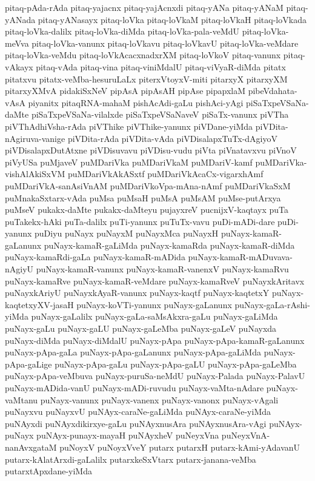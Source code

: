{pitaq-pAda-rAda
pitaq-yajacnx
pitaq-yajAcnxdi
pitaq-yANa
pitaq-yANaM
pitaq-yANada
pitaq-yANasayx
pitaq-loVka
pitaq-loVkaM
pitaq-loVkaH
pitaq-loVkada
pitaq-loVka-dalilx
pitaq-loVka-diMda
pitaq-loVka-pala-veMdU
pitaq-loVka-meVva
pitaq-loVka-vanunx
pitaq-loVkavu
pitaq-loVkavU
pitaq-loVka-veMdare
pitaq-loVka-veMdu
pitaq-loVkAcacxnadxrXM
pitaq-loVkoV
pitaq-vanunx
pitaq-vAkayx
pitaq-vAda
pitaq-vina
pitaq-viniMdalU
pitaq-viVyaR-diMda
pitatx
pitatxvu
pitatx-veMba-hesuruLaLx
piterxVtoyxV-miti
pitarxyX
pitarxyXM
pitarxyXMvA
pidakiSxNeV
pipAsA
pipAsAH
pipAse
pipapxlaM
pibeVdahata-vAsA
piyanitx
pitaqRNA-mahaM
pishAcAdi-gaLu
pishAci-yAgi
piSaTxpeVSaNa-daMte
piSaTxpeVSaNa-vilalxde
piSaTxpeVSaNaveV
piSaTx-vanunx
piVTha
piVThAdhiVsha-rAda
piVThike
piVThike-yanunx
piVDane-yiMda
piVDita-nAgiruva-vanige
piVDita-rAda
piVDita-vAda
piVDisalapxTuTx-dAgiyoV
piVDisalapxDutAtxne
piVDisuvavu
piVDisu-vudu
piVta
piVnatavxvu
piVnoV
piVyUSa
puMjaveV
puMDariVka
puMDariVkaM
puMDariV-kamf
puMDariVka-vishAlAkiSxVM
puMDariVkAkASxtf
puMDariVkAcaCx-vigarxhAmf
puMDariVkA-sanAsiVnAM
puMDariVkoVpa-mAna-nAmf
puMDariVkaSxM
puMnakaSxtarx-vAda
puMsa
puMsaH
puMsA
puMsAM
puMse-putArxya
puMseV
pukakx-daMte
pukakx-daMteyu
pujayxreV
pucnijxV-kaqtayx
puTa
puTakekx-hAki
puTa-dalilx
puTi-yanunx
puTuTx-vavu
puDi-mADi-dare
puDi-yanunx
puDiyu
puNayx
puNayxM
puNayxMca
puNayxH
puNayx-kamaR-gaLanunx
puNayx-kamaR-gaLiMda
puNayx-kamaRda
puNayx-kamaR-diMda
puNayx-kamaRdi-gaLa
puNayx-kamaR-mADida
puNayx-kamaR-mADuvava-nAgiyU
puNayx-kamaR-vanunx
puNayx-kamaR-vanenxV
puNayx-kamaRvu
puNayx-kamaRve
puNayx-kamaR-veMdare
puNayx-kamaRveV
puNayxkAritavx
puNayxkAriyU
puNayxkAyaR-vanunx
puNayx-kaqtf
puNayx-kaqtetxY
puNayx-kaqtetxyXV-jasaH
puNayx-koVTi-yanunx
puNayx-gaLanunx
puNayx-gaLa-rAshi-yiMda
puNayx-gaLalilx
puNayx-gaLa-saMsAkxra-gaLu
puNayx-gaLiMda
puNayx-gaLu
puNayx-gaLU
puNayx-gaLeMba
puNayx-gaLeV
puNayxda
puNayx-diMda
puNayx-diMdalU
puNayx-pApa
puNayx-pApa-kamaR-gaLanunx
puNayx-pApa-gaLa
puNayx-pApa-gaLanunx
puNayx-pApa-gaLiMda
puNayx-pApa-gaLige
puNayx-pApa-gaLu
puNayx-pApa-gaLU
puNayx-pApa-gaLeMba
puNayx-pApa-veMbuva
puNayx-puruSa-neMdU
puNayx-Palada
puNayx-PalavU
puNayx-mADida-vanU
puNayx-mADi-ruvudu
puNayx-vaMta-nAdare
puNayx-vaMtanu
puNayx-vanunx
puNayx-vanenx
puNayx-vanonx
puNayx-vAgali
puNayxvu
puNayxvU
puNAyx-caraNe-gaLiMda
puNAyx-caraNe-yiMda
puNAyxdi
puNAyxdikirxye-gaLu
puNAyxnusAra
puNAyxnusAra-vAgi
puNAyx-puNayx
puNAyx-punayx-mayaH
puNAyxheV
puNeyxVna
puNeyxVnA-nanAvxgataM
puNoyxV
puNoyxVveY
putarx
putarxH
putarx-kAmi-yAdavanU
putarx-kAlatArxdi-gaLalilx
putarxkeSxVtarx
putarx-janana-veMba
putarxtApxdane-yiMda
}
